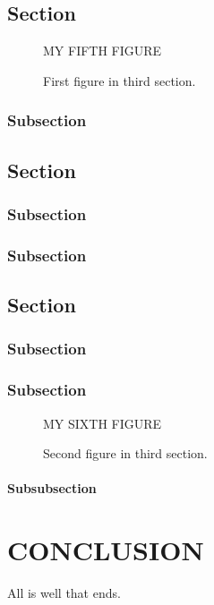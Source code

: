 \documentclass[10pt,econ,letterpaper]{authesis}
\begin{document}
\section{Section}

\begin{figure}
\centering MY FIFTH FIGURE
\caption{First figure in third section.}
\end{figure}


\subsection{Subsection}

\section{Section}
\subsection{Subsection}
\subsection{Subsection}
\section{Section}
\subsection{Subsection}
\subsection{Subsection}

\begin{figure}
\centering MY SIXTH FIGURE
\caption{Second figure in third section.}
\end{figure}


\subsubsection{Subsubsection}


\chapter{CONCLUSION}

All is well that ends.
\end{document}
